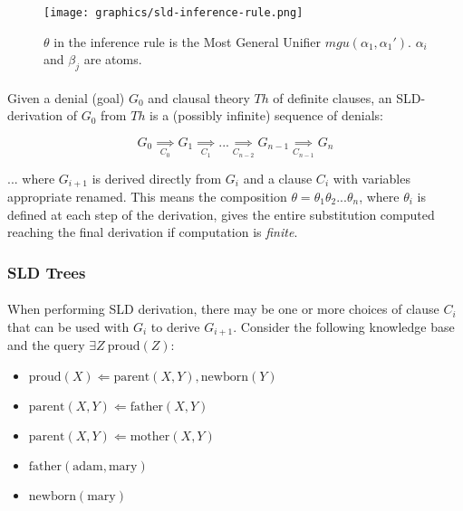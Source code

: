 \documentclass{article}
\theoremstyle{plain}
\theoremstyle{definition}
\begin{document}
\begin{multicols}{2}
\begin{figure}[H]
\centering
\texttt{[image: graphics/sld-inference-rule.png]}
\caption{$\theta$ in the inference rule is the Most General Unifier $mgu(\alpha_1, \alpha_1')$. $\alpha_i$ and $\beta_j$ are atoms.}
\end{figure}

\paragraph{} Given a denial (goal) $G_0$ and clausal theory $Th$ of definite clauses, an SLD-derivation of $G_0$ from $Th$ is a (possibly infinite) sequence of denials:

$$G_0 \underset{C_0}{\implies} G_1 \underset{C_1}{\implies} ...  \underset{C_{n-2}}{\implies} G_{n - 1}\underset{C_{n - 1}}{\implies} G_n  $$

\noindent ... where $G_{i + 1}$ is derived directly from $G_i$ and a clause $C_i$ with variables appropriate renamed. This means the composition $\theta = \theta_1 \theta_2 ... \theta_n$, where $\theta_i$ is defined at each step of the derivation, gives the entire substitution computed reaching the final derivation if computation is \textit{finite}.

\subsubsection{SLD Trees}

\paragraph{} When performing SLD derivation, there may be one or more choices of clause $C_i$ that can be used with $G_i$ to derive $G_{i+1}$. Consider the following knowledge base and the query $\exists Z\ \text{proud}(Z)$:

\begin{itemize}
\setlength\itemsep{0.0em}
\item[] $\text{proud}(X) \Leftarrow \text{parent}(X, Y), \text{newborn}(Y)$
\item[] $\text{parent}(X, Y) \Leftarrow \text{father}(X, Y)$
\item[] $\text{parent}(X, Y) \Leftarrow \text{mother}(X, Y)$
\item[] $\text{father}(\text{adam}, \text{mary})$
\item[] $\text{newborn}(\text{mary})$
\end{itemize}



\end{multicols}
\end{document}
